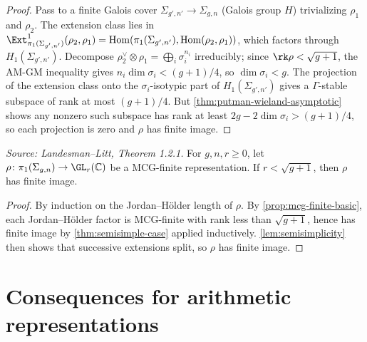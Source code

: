 \begin{proof}
  Pass to a finite Galois cover $\Sigma_{g',n'} \to \Sigma_{g,n}$ (Galois
  group $H$) trivializing $\rho_1$ and $\rho_2$.
  The extension class lies in
  $\Ext^1_{\pi_1(\Sigma_{g',n'})}(\rho_2, \rho_1)
  = \mathrm{Hom}(\pi_1(\Sigma_{g',n'}), \mathrm{Hom}(\rho_2,\rho_1))$,
  which factors through $H_1(\Sigma_{g',n'})$.
  Decompose $\rho_2^\vee \otimes \rho_1 = \bigoplus_i \sigma_i^{n_i}$
  irreducibly; since $\rk\rho < \sqrt{g+1}$, the AM-GM inequality gives
  $n_i \dim\sigma_i < (g+1)/4$, so $\dim\sigma_i < g$.
  The projection of the extension class onto the $\sigma_i$-isotypic part of
  $H_1(\Sigma_{g',n'})$ gives a $\Gamma$-stable subspace of rank at most
  $(g+1)/4$.
  But \cref{thm:putman-wieland-asymptotic} shows any nonzero such subspace has
  rank at least $2g - 2\dim\sigma_i > (g+1)/4$, so each projection is zero
  and $\rho$ has finite image.
\end{proof}

\begin{theorem}
  \label{thm:finite-image}
  \textit{Source: Landesman--Litt, Theorem 1.2.1.}
  For $g, n, r \geq 0$, let
  $\rho\colon \pi_1(\Sigma_{g,n}) \to \GL_r(\mathbb{C})$ be a MCG-finite
  representation.
  If $r < \sqrt{g+1}$, then $\rho$ has finite image.
\end{theorem}

\begin{proof}
  By induction on the Jordan--H\"older length of $\rho$.
  By \cref{prop:mcg-finite-basic}, each Jordan--H\"older factor is MCG-finite
  with rank less than $\sqrt{g+1}$, hence has finite image by
  \cref{thm:semisimple-case} applied inductively.
  \cref{lem:semisimplicity} then shows that successive extensions split, so
  $\rho$ has finite image.
\end{proof}

\section{Consequences for arithmetic representations}

